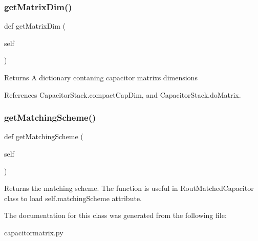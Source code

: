 \subsubsection{\texorpdfstring{get\+Matrix\+Dim()}{getMatrixDim()}}
{\footnotesize\ttfamily def get\+Matrix\+Dim (\begin{DoxyParamCaption}\item[{}]{self }\end{DoxyParamCaption})}

\begin{DoxyReturn}{Returns}
A dictionary contaning capacitor matrix\textquotesingle{}s dimensions 
\end{DoxyReturn}


References Capacitor\+Stack.\+compact\+Cap\+Dim, and Capacitor\+Stack.\+do\+Matrix.

\mbox{\label{classpython_1_1capacitormatrix_1_1CapacitorStack_a47fab36d1c5f43b77f6a8bed838f489c}} 
\subsubsection{\texorpdfstring{get\+Matching\+Scheme()}{getMatchingScheme()}}
{\footnotesize\ttfamily def get\+Matching\+Scheme (\begin{DoxyParamCaption}\item[{}]{self }\end{DoxyParamCaption})}

\begin{DoxyReturn}{Returns}
the matching scheme. The function is useful in {\ttfamily Rout\+Matched\+Capacitor} class to load {\ttfamily self.\+matching\+Scheme} attribute. 
\end{DoxyReturn}


The documentation for this class was generated from the following file\+:\begin{DoxyCompactItemize}
\item 
capacitormatrix.\+py\end{DoxyCompactItemize}
